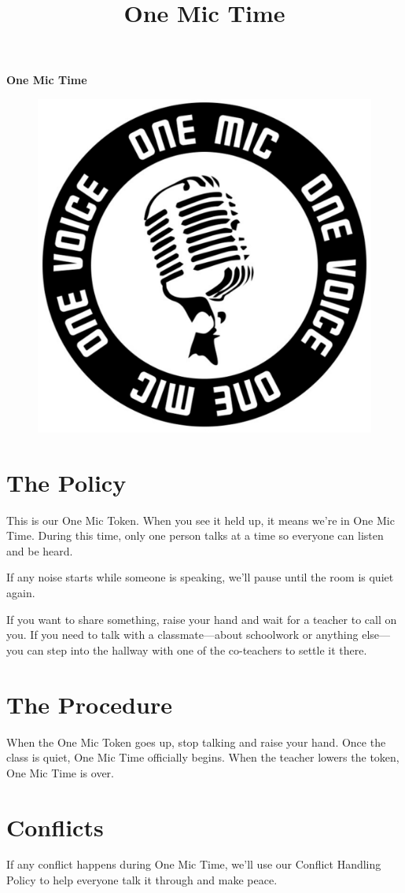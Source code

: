 \documentclass[12pt]{article}
\title{One Mic Time}
\date{}
\begin{document}
\begin{center}
\Huge
\bf One Mic Time

\begin{figure}[h]
\includegraphics[width=.7\textwidth, center]{one-mic-token.jpg}
\end{figure}
\end{center}
\section*{The Policy}
This is our One Mic Token. When you see it held up, it means we’re in One Mic Time. During this time, only one person talks at a time so everyone can listen and be heard.

If any noise starts while someone is speaking, we’ll pause until the room is quiet again.

If you want to share something, raise your hand and wait for a teacher to call on you. If you need to talk with a classmate—about schoolwork or anything else—you can step into the hallway with one of the co-teachers to settle it there.

\section*{The Procedure}
When the One Mic Token goes up, stop talking and raise your hand. Once the class is quiet, One Mic Time officially begins. When the teacher lowers the token, One Mic Time is over.

\section*{Conflicts}
If any conflict happens during One Mic Time, we’ll use our Conflict Handling Policy to help everyone talk it through and make peace.
\end{document}
